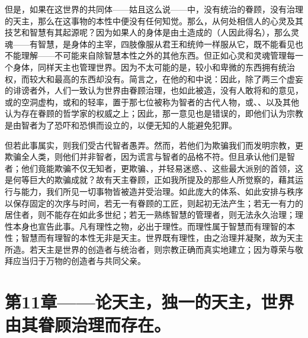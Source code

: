 但是，如果在这世界的共同体——姑且这么说——中，没有统治的眷顾，没有治理的天主，那么在这事物的本性中便没有任何知觉。那么，从何处相信人的心灵及其技艺和智慧有其起源呢？因为如果人的身体是由土造成的（人因此得名），那么灵魂——有智慧，是身体的主宰，四肢像服从君王和统帅一样服从它，既不能看见也不能理解——不可能来自除智慧本性之外的其他东西。但正如心灵和灵魂管理每一个身体，同样天主也管理世界。因为不太可能的是，较小和卑微的东西拥有统治权，而较大和最高的东西却没有。简言之，在他的和中说：因此，除了两三个虚妄的诽谤者外，人们一致认为世界由眷顾治理，也如此被造，没有人敢将和的意见，或的空洞虚构，或和的轻率，置于那七位被称为智者的古代人物，或、、以及其他认为存在眷顾的哲学家的权威之上；因此，那一意见也是错误的，即他们认为宗教是由智者为了恐吓和恐惧而设立的，以便无知的人能避免犯罪。\par

但若此事属实，则我们受古代智者愚弄。然而，若他们为欺骗我们而发明宗教，更欺骗全人类，则他们并非智者，因为谎言与智者的品格不符。但且承认他们是智者；他们竟能欺骗不仅无知者，更欺骗、，并轻易迷惑、、这些最大派别的首领，这是何等巨大的欺骗成就？故有天主眷顾，正如我所提及的那些人所觉察的，藉其运行与能力，我们所见一切事物皆被造并受治理。如此庞大的体系、如此安排与秩序以保存固定的次序与时间，若无一有眷顾的工匠，则起初无法产生；若无一有力的居住者，则不能存在如此多世纪；若无一熟练智慧的管理者，则无法永久治理；理性本身也宣告此事。凡有理性之物，必出于理性。而理性属于智慧而有理智的本性；智慧而有理智的本性无非是天主。世界既有理性，由之治理并凝聚，故为天主所造。若天主是世界的创造者与统治者，则宗教正确而真实地建立；因为尊荣与敬拜应当归于万物的创造者与共同父亲。\par


\section{第11章——论天主，独一的天主，世界由其眷顾治理而存在。}

